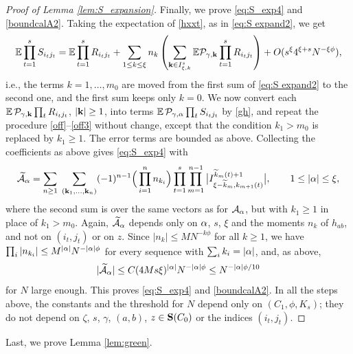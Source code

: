 \begin{proof}[Proof of Lemma \ref{lem:S_expansion}]
Finally, we prove \eqref{eq:S_exp4} and \eqref{boundcalA2}. Taking the expectation of \eqref{hxxt}, as in \eqref{eq:S expand2}, we get 
\begin{equation} 
\mathbb{E}\prod_{t=1}^{s} S_{i_t j_t} 
=\mathbb{E}\prod_{t=1}^{s} R_{i_t j_t} + \sum _{1\leq k\leq \xi } n_k\left( \sum_{{\bf k}\in I^s_{\xi, k}}
\mathbb{E}\mathcal P_{\gamma, {\bf k}}\prod_{t=1} ^sR _{i_tj_t}   \right) +
O(  s^{  \xi} 4^{ \xi+s} N^{-\xi\phi}),
\end{equation} 
i.e., the terms $k=1,\dots,m_0$ are moved from the first sum of \eqref{eq:S expand2} to the second one, and the first sum keeps only $k=0$. We now convert each $\mathbb{E}\,\mathcal P_{\gamma,{\bf k}}\prod_t R_{i_tj_t}$, $|{\bf k}|\ge1$, into terms $\mathbb{E}\,\mathcal P_{\gamma,\alpha}\prod_t S_{i_tj_t}$ by \eqref{gh}, and repeat the procedure \eqref{off}--\eqref{off3} without change, except that the condition $k_1>m_0$ is replaced by $k_1\ge1$. The error terms are bounded as above. Collecting the coefficients as above gives \eqref{eq:S_exp4} with
$$
\widetilde{\mathcal A}_\alpha=\sum_{n\ge1}\;\sum_{({\bf k}_1,\dots,{\bf k}_n)}(-1)^{n-1}\Big(\prod_{i=1}^n n_{k_i}\Big)\prod_{t=1}^s\prod_{m=1}^{n-1}\big|I^{\widetilde k_m(t)+1}_{\xi-\widetilde k_m,k_{m+1}(t)}\big|, \qquad 1\le|\alpha|\le\xi,
$$
where the second sum is over the same vectors as for $\mathcal A_\alpha$, but with $k_1\ge1$ in place of $k_1>m_0$. Again, $\widetilde{\mathcal A}_\alpha$ depends only on $\alpha$, $s$, $\xi$ and the moments $n_k$ of $h_{ab}$, and not on $(i_t,j_t)$ or on $z$. Since $|n_k|\le MN^{-k\phi}$ for all $k\ge1$, we have $\prod_i|n_{k_i}|\le M^{|\alpha|}N^{-|\alpha|\phi}$ for every sequence with $\sum_ik_i=|\alpha|$, and, as above,
$$
|\widetilde{\mathcal A}_\alpha|\le C(4Ms\xi)^{|\alpha|}N^{-|\alpha|\phi}\le N^{-|\alpha|\phi/10}
$$
for $N$ large enough. This proves \eqref{eq:S_exp4} and \eqref{boundcalA2}. In all the steps above, the constants and the threshold for $N$ depend only on $(C_1,\phi,K_s)$; they do not depend on $\zeta$, $s$, $\gamma$, $(a,b)$, $z\in{\bf S}(C_0)$ or the indices $(i_t,j_t)$.
\end{proof}


Last, we prove Lemma \ref{lem:green}.
 
